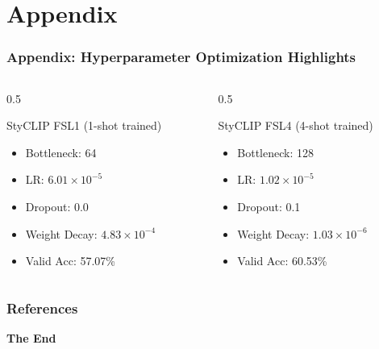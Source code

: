 \documentclass[aspectratio=169,xcolor=dvipsnames]{beamer}
\begin{document}
\appendix
\section{Appendix}

\begin{frame}
  \frametitle{Appendix: Hyperparameter Optimization Highlights}
  \begin{columns}[T] %
    \begin{column}{0.5\textwidth}
      \begin{block}{StyCLIP FSL1 (1-shot trained)}
        \begin{itemize}
          \item Bottleneck: 64
          \item LR: $6.01 \times 10^{-5}$
          \item Dropout: 0.0
          \item Weight Decay: $4.83 \times 10^{-4}$
          \item Valid Acc: 57.07\%
        \end{itemize}
      \end{block}
    \end{column}
    \begin{column}{0.5\textwidth}
      \begin{block}{StyCLIP FSL4 (4-shot trained)}
        \begin{itemize}
          \item Bottleneck: 128
          \item LR: $1.02 \times 10^{-5}$
          \item Dropout: 0.1
          \item Weight Decay: $1.03 \times 10^{-6}$
          \item Valid Acc: 60.53\%
        \end{itemize}
      \end{block}
    \end{column}
  \end{columns}
\end{frame}


\begin{frame}[allowframebreaks]
    \frametitle{References}
    \footnotesize %
    
\end{frame}

\begin{frame}
    \Huge{\centerline{\textbf{The End}}}
\end{frame}
\end{document}
